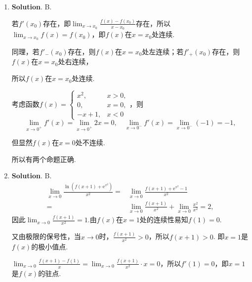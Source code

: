 \documentclass[../main.tex]{subfiles}
\begin{document}
\begin{enumerate}
          通解$(C_{1}+C_{2} x)\mathrm{e}^{x}$对应齐次方程的二重特征根$r=1$，所以齐次方程为$y
              ''-2y'+y=0$.

          将特解$y^{*}=x$代入非齐次方程验证可得D选项$y''-2y'+y=x-2$满足题意.

    \item \textbf{Solution}. B.

          若$f'(x_{0})$存在，即$\lim_{x\to x_0}\frac{f(x)-f(x_{0})}{x-x_{0}}$存在，所以$\lim
              _{x\to x_0}f(x)=f(x_{0})$，即$f(x)$在$x=x_{0}$处连续.

          同理，若$f'_{-}(x_{0})$存在，则$f(x)$在$x=x_{0}$处左连续；若$f'_{+}(x_{0})$存在，则$f
              (x)$在$x=x_{0}$处右连续，

          所以$f(x)$在$x=x_{0}$处连续.

          考虑函数$f(x)=
              \begin{cases}
                  x^{2}, & x>0, \\
                  0,     & x=0, \\
                  -x+1,  & x<0
              \end{cases}$，则
          \[
              \lim_{x\to0^+}f'(x)=\lim_{x\to0^+}2x=0,\quad\lim_{x\to0^-}f'
              (x)=\lim_{x\to0^-}(-1)= -1,
          \]

          但显然$f(x)$在$x=0$处不连续.

          所以有两个命题正确.

    \item \textbf{Solution}. B.
          \[
              \begin{aligned}
                  \lim_{x\to0}\frac{\ln\left(f(x+1)+\mathrm{e}^{x^2}\right)}{x^2}= {} & \lim_{x\to0}\frac{f(x+1)+\mathrm{e}^{x^2}-1}{x^2}              \\
                  = {}                                                                & \lim_{x\to0}\frac{f(x+1)}{x^2}+\lim_{x\to0}\frac{x^2}{x^2}= 2,
              \end{aligned}
          \]
          因此$\lim_{x\to0}\frac{f(x+1)}{x^{2}}=1$.由$f(x)$在$x=1$处的连续性易知$f(1)
              =0$.

          又由极限的保号性，当$x\to0$时，$\frac{f(x+1)}{x^{2}}>0$，所以$f(x+1)>0$. 即$x
              =1$是$f(x)$的极小值点.

          $\lim_{x\to 0}\frac{f(x+1)-f(1)}{x}=\lim_{x\to0}\frac{f(x+1)}{x^{2}}\cdot x
              =0$，所以$f'(1)=0$，即$x=1$是$f(x)$的驻点.


\end{enumerate}
\end{document}
